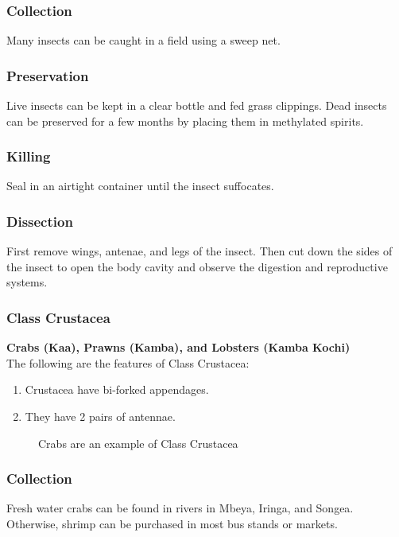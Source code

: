 \subsubsection{Collection}
Many insects can be caught in a field using a sweep net. 

\subsubsection{Preservation} 
Live insects can be kept in a clear bottle and fed grass clippings. Dead insects can be preserved for a few months by placing them in methylated spirits.

\subsubsection{Killing}
Seal in an airtight container until the insect suffocates.

\subsubsection{Dissection}
First remove wings, antenae, and legs of the insect. Then cut down the sides of the insect to open the body cavity and observe the digestion and reproductive systems.
	
\subsubsection{Class Crustacea}
\textbf{Crabs (Kaa), Prawns (Kamba), and Lobsters (Kamba Kochi)}\\
The following are the features of Class Crustacea:
\begin{enumerate}
\item{Crustacea have bi-forked appendages.}
\item{They have 2 pairs of antennae.}
\end{enumerate}

\begin{figure}[h]
\begin{center}
\def\svgwidth{6cm}

\caption{Crabs are an example of Class Crustacea}
\label{fig:crab}
\end{center}
\end{figure}

\subsubsection{Collection}
Fresh water crabs can be found in rivers in Mbeya, Iringa, and Songea. Otherwise, shrimp can be purchased in most bus stands or markets.

